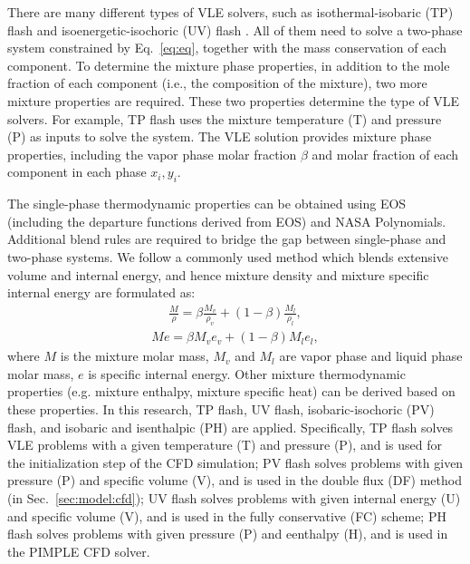 There are many different types of VLE solvers, such as isothermal-isobaric (TP) flash \cite{michelsen1982isothermal} and isoenergetic-isochoric (UV) flash \cite{saha1997isoenergetic}. All of them need to solve a two-phase system constrained by Eq.~\ref{eq:eq}, together with the mass conservation of each component. To determine the mixture phase properties, in addition to the mole fraction of each component (i.e., the composition of the mixture), two more mixture properties are required. These two properties determine the type of VLE solvers. For example, TP flash uses the mixture temperature (T) and pressure (P) as inputs to solve the system. The VLE solution provides mixture phase properties, including the vapor phase molar fraction $\beta$ and molar fraction of each component in each phase $x_i,y_i$.

The single-phase thermodynamic properties can be obtained using EOS (including the departure functions derived from EOS) and NASA Polynomials. Additional blend rules are required to bridge the gap between single-phase and two-phase systems. We follow a commonly used method which blends \cite{matheis2018multi,tudisco2020numerical} extensive volume and internal energy, and hence mixture density and mixture specific internal energy are formulated as:
\begin{align} \frac{M}{\rho} = \beta \frac{M_v}{\rho_v}+\left(1-\beta\right)\frac{M_l}{\rho_l}, \label{eq:rho}
\end{align}
\begin{align} Me = \beta M_v e_v + \left(1-\beta\right)M_l e_l, \label{eq:e}
\end{align}
where $M$ is the mixture molar mass, $M_v$ and $M_l$ are vapor phase and liquid phase molar mass, $e$ is specific internal energy.
Other mixture thermodynamic properties (e.g. mixture enthalpy, mixture specific heat) can be derived based on these properties.
In this research, TP flash, UV flash, isobaric-isochoric (PV) flash, and isobaric and isenthalpic (PH) are applied. Specifically,
TP flash solves VLE problems with a given temperature (T) and pressure (P), and is used for the initialization step of the CFD simulation; PV flash solves problems with given pressure (P) and specific volume (V), and is used in the double flux (DF) method (in Sec.~\ref{sec:model:cfd}); UV flash solves problems with given internal energy (U) and specific volume (V), and is used in the fully conservative (FC) scheme; PH flash solves problems with given pressure (P) and eenthalpy (H), and is used in the PIMPLE CFD solver.

